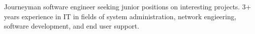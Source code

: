 

\begin{cvparagraph}

Journeyman software engineer seeking junior positions on interesting projects.  3+ years experience in IT in fields of system administration, network engieering, software development, and end user support.
\end{cvparagraph}
